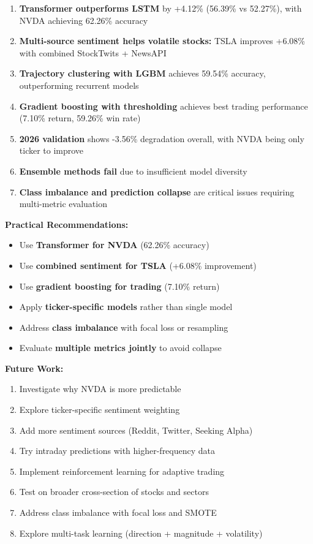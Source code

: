 \documentclass[10pt,twocolumn]{article}
\begin{document}
\begin{enumerate}
\item \textbf{Transformer outperforms LSTM} by +4.12\% (56.39\% vs 52.27\%), with NVDA achieving 62.26\% accuracy
\item \textbf{Multi-source sentiment helps volatile stocks:} TSLA improves +6.08\% with combined StockTwits + NewsAPI
\item \textbf{Trajectory clustering with LGBM} achieves 59.54\% accuracy, outperforming recurrent models
\item \textbf{Gradient boosting with thresholding} achieves best trading performance (7.10\% return, 59.26\% win rate)
\item \textbf{2026 validation} shows -3.56\% degradation overall, with NVDA being only ticker to improve
\item \textbf{Ensemble methods fail} due to insufficient model diversity
\item \textbf{Class imbalance and prediction collapse} are critical issues requiring multi-metric evaluation
\end{enumerate}

\textbf{Practical Recommendations:}
\begin{itemize}
\item Use \textbf{Transformer for NVDA} (62.26\% accuracy)
\item Use \textbf{combined sentiment for TSLA} (+6.08\% improvement)
\item Use \textbf{gradient boosting for trading} (7.10\% return)
\item Apply \textbf{ticker-specific models} rather than single model
\item Address \textbf{class imbalance} with focal loss or resampling
\item Evaluate \textbf{multiple metrics jointly} to avoid collapse
\end{itemize}

\textbf{Future Work:}
\begin{enumerate}
\item Investigate why NVDA is more predictable
\item Explore ticker-specific sentiment weighting
\item Add more sentiment sources (Reddit, Twitter, Seeking Alpha)
\item Try intraday predictions with higher-frequency data
\item Implement reinforcement learning for adaptive trading
\item Test on broader cross-section of stocks and sectors
\item Address class imbalance with focal loss and SMOTE
\item Explore multi-task learning (direction + magnitude + volatility)
\end{enumerate}
\end{document}
